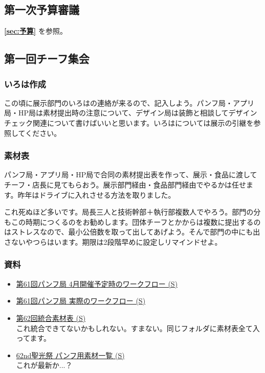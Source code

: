 \documentclass[dvipdfmx,jb5]{jarticle}
\begin{document}
\subsection{第一次予算審議}
{\bf \ref{sec:予算}} を参照。

\subsection{第一回チーフ集会}\label{sec:第一回チーフ集会}
\subsubsection{いろは作成}
この頃に展示部門のいろはの連絡が来るので、記入しよう。パンフ局・アプリ局・HP局は素材提出時の注意について、デザイン局は装飾と相談してデザインチェック関連について書けばいいと思います。いろはについては展示の引継を参照してください。

\subsubsection{素材表}
パンフ局・アプリ局・HP局で合同の素材提出表を作って、展示・食品に渡してチーフ・店長に見てもらおう。展示部門経由・食品部門経由でやるかは任せます。昨年はドライブに入れさせる方法を取りました。

これ死ぬほど多いです。局長三人と技術幹部＋執行部複数人でやろう。部門の分もこの時期につくるのをお勧めします。団体チーフとかからは複数に提出するのはストレスなので、最小公倍数を取って出してあげよう。そんで部門の中にも出さないやつらはいます。期限は2段階早めに設定しリマインドせよ。

\subsubsection{資料}
\begin{itemize}
  \item \href{https://docs.google.com/spreadsheets/d/1CQqoQk9K2541dx-WhdyMl7i6m3l4NQxOgOrnMKgY9Eg/edit?usp=sharing}{第61回パンフ局 4月開催予定時のワークフロー (S)}
  \item \href{https://docs.google.com/spreadsheets/d/1_B39iTxYG4pPTYhmjbtjTS1wA9dnm_Zg4s-35IgFcXM/edit?usp=sharing}{第61回パンフ局 実際のワークフロー (S)}
  \item \href{https://docs.google.com/spreadsheets/d/1NF84N6ftFbk_4xFw5B_V4LpxlGhZCpm0oSgIBLLYLrs/edit?usp=sharing}{第62回統合素材表 (S)}
  \\ これ統合できてないかもしれない。すまない。同じフォルダに素材表全て入ってます。
  \item \href{https://docs.google.com/spreadsheets/d/1-toba1DrCHhMQ5el9HqFxUu-kmNuYwbTGwxs1x6KUWQ/edit?usp=sharing}{62nd聖光祭 パンフ用素材一覧 (S)}
  \\ これが最新か...？
\end{itemize}
\end{document}
